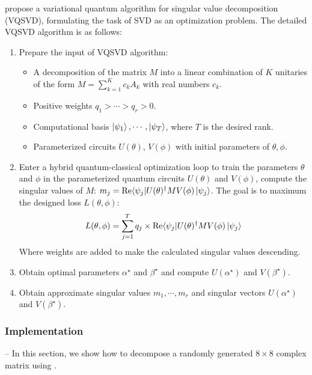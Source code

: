 \cite{wang2021variational} propose a variational quantum algorithm for singular value decomposition (VQSVD), formulating the task of SVD as an optimization problem. The detailed VQSVD algorithm is as follows:
\begin{enumerate}
    \item Prepare the input of VQSVD algorithm:
        \begin{itemize}
            \item A decomposition of the matrix $M$ into a linear combination of $K$ unitaries of the form $M = \sum_{k=1}^K c_k A_k$ with real numbers $c_k$.
            \item Positive weights $q_1 > \cdots > q_r > 0$.
            \item Computational basis {$\ket{\psi_1}, \cdots, \ket{\psi_T}$}, where $T$ is the desired rank.
            \item Parameterized circuits $U(\theta)$, $V(\phi)$ with initial parameters of $\theta, \phi$.
        \end{itemize}
    \item Enter a hybrid quantum-classical optimization loop to train the parameters $\theta$ and $\phi$ in the parameterized quantum circuits $U(\theta)$ and $V(\phi)$, compute the singular values of $M$: $m_j = \text{Re}\langle\psi_j|U(\theta)^{\dagger} M V(\phi)\ket{\psi_j}$. The goal is to maximum the designed loss $L(\theta, \phi)$:
    \begin{equation}
        L(\theta, \phi) = \sum_{j=1}^T q_j \times \text{Re} \langle\psi_j| U(\theta)^{\dagger} M V(\phi)\ket{\psi_j}
    \end{equation}
    Where weights are added to make the calculated singular values descending.
    \item Obtain optimal parameters $\alpha^ \star$ and $\beta^\star$ and compute $U(\alpha^\star)$ and $V(\beta^\star)$.
    \item Obtain approximate singular values ${m_1, \cdots, m_r}$ and  singular vectors $U(\alpha^\star)$ and $V(\beta^\star)$.
\end{enumerate}

\subsubsection{Implementation} -- In this section, we show how to decompose a randomly generated $8 \times 8$ complex matrix using \MindQuantum.

